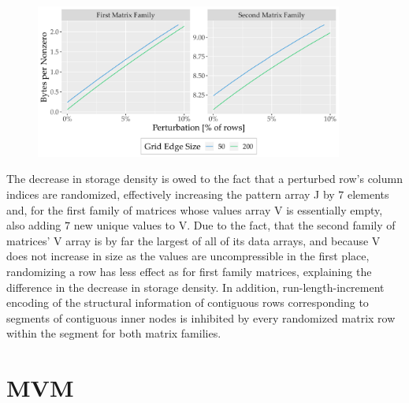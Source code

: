     \begin{figure}[H]
      \centering
      \captionsetup{width=0.9\textwidth}
      \includegraphics[width=0.9\textwidth]{assets/bytespernnz-perturbed}
      \label{fig:bytespernnz-perturbed}
    \end{figure}

    The decrease in storage density is owed to the fact that a perturbed row's column indices are randomized,
    effectively increasing the pattern array J by $7$ elements and, for the first family of matrices whose values array
    V is essentially empty, also adding $7$ new unique values to V. Due to the fact, that the second family of matrices'
    V array is by far the largest of all of its data arrays, and because V does not increase in size as the values are
    uncompressible in the first place, randomizing a row has less effect as for first family matrices, explaining the
    difference in the decrease in storage density. In addition, run-length-increment encoding of the structural
    information of contiguous rows corresponding to segments of contiguous inner nodes is inhibited by every randomized
    matrix row within the segment for both matrix families.



  \section{MVM}

